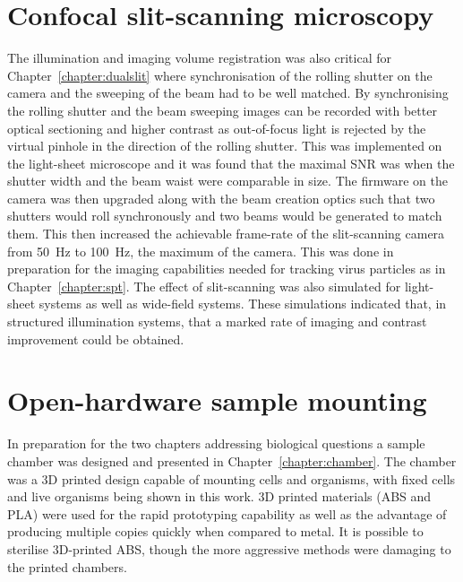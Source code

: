 \section{Confocal \gls{slit-scanning} microscopy}
The illumination and imaging volume registration was also critical for Chapter~\ref{chapter:dualslit} where synchronisation of the rolling shutter on the camera and the sweeping of the beam had to be well matched.
By synchronising the rolling shutter and the beam sweeping images can be recorded with better optical sectioning and higher contrast as out-of-focus light is rejected by the virtual pinhole in the direction of the rolling shutter.
This was implemented on the light-sheet microscope and it was found that
the maximal \gls{SNR} was when the shutter width and the beam waist were comparable in size.
The firmware on the camera was then upgraded along with the beam creation optics such that two shutters would roll synchronously and two beams would be generated to match them.
This then increased the achievable frame-rate of the slit-scanning camera from \SI{50}{\hertz} to \SI{100}{\hertz}, the maximum of the camera.
This was done in preparation for the imaging capabilities needed for tracking virus particles as in Chapter~\ref{chapter:spt}.
The effect of slit-scanning was also simulated for light-sheet systems as well as wide-field systems.
These simulations indicated that, in structured illumination systems, that a marked rate of imaging and contrast improvement could be obtained.

\section{Open-hardware sample mounting}
In preparation for the two chapters addressing biological questions a sample chamber was designed and presented in Chapter~\ref{chapter:chamber}.
The chamber was a \gls{3D} printed design capable of mounting cells  and organisms, with fixed cells and live organisms being shown in this work.
\gls{3D} printed materials (\gls{ABS} and \gls{PLA}) were used for the rapid prototyping capability as well as the advantage of producing multiple copies quickly when compared to metal.
It is possible to sterilise \gls{3D}-printed \gls{ABS}, though the more aggressive methods were damaging to the printed chambers.

